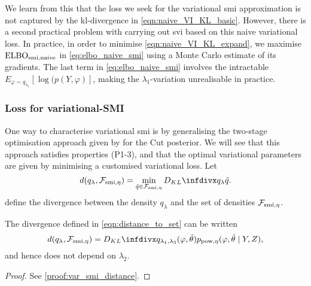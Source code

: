 We learn from this that the loss we seek for the variational \acrshort*{smi} approximation is not captured by the \acrshort*{kl}-divergence in \cref{eqn:naive_VI_KL_basic}.
However, there is a second practical problem with carrying out \acrlong*{svi} based on this naive variational loss.
In practice, in order to minimise \cref{eqn:naive_VI_KL_expand}, we maximise $\operatorname{\text{ELBO}}_{\operatorname{\text{smi}},\text{naive}}$ in \cref{eq:elbo_naive_smi}
using a Monte Carlo estimate of its gradients.
The last term in \cref{eq:elbo_naive_smi} involves the intractable $E_{\varphi\sim q_{\lambda_1}}[\log(p(Y, \varphi)]$, making the $\lambda_1$-variation unrealisable in practice.



\subsubsection{Loss for variational-SMI}

One way to characterise variational \acrshort*{smi} is by generalising the two-stage optimisation approach given by \cite{Yu2021variationalcut} for the Cut posterior. We will see that this approach satisfies properties (P1-3), and that the optimal variational parameters are given by minimising a customised variational loss.
Let
\begin{equation}\label{eqn:distance_to_set}
  d(q_{\lambda},\mathcal{F}_{\smi,\eta})=\min_{\tilde q\in \mathcal{F}_{\smi,\eta}}\kl{q_{\lambda}}{\tilde q}.
\end{equation}
define the divergence between the density $q_{\lambda}$ and the set of densities $\mathcal{F}_{\operatorname{\text{smi}},\eta}$.

\begin{proposition}\label{prop:var_smi_distance}
  The divergence defined in \cref{eqn:distance_to_set} can be written
  \begin{equation}\label{eqn:var_smi_distance}
    d(q_{\lambda},\mathcal{F}_{\smi,\eta})=\kl{q_{\lambda_1, \lambda_3}(\varphi, \tilde\theta)}{p_{\pow, \eta}(\varphi,\tilde\theta \mid Y,Z)},
  \end{equation}
  and hence does not depend on $\lambda_2$.
\end{proposition}
\begin{proof}
  See \cref{proof:var_smi_distance}.
\end{proof}


